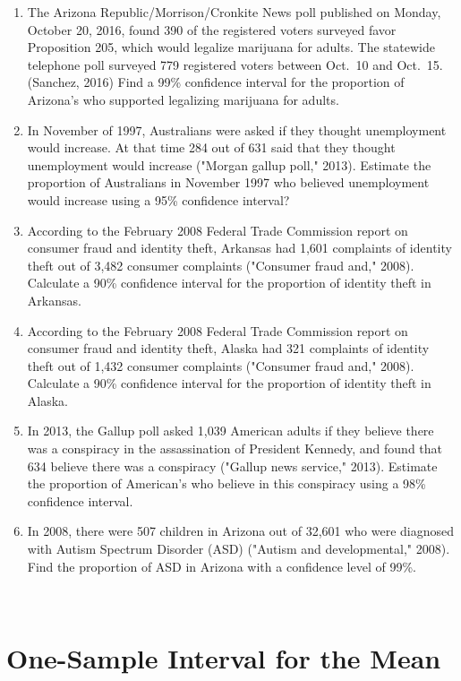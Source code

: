 \documentclass[]{book}
\begin{document}
\begin{enumerate}
\def\labelenumi{\arabic{enumi}.}
\item
  The Arizona Republic/Morrison/Cronkite News poll published on Monday, October 20, 2016, found 390 of the registered voters surveyed favor Proposition 205, which would legalize marijuana for adults. The statewide telephone poll surveyed 779 registered voters between Oct.~10 and Oct.~15. (Sanchez, 2016) Find a 99\% confidence interval for the proportion of Arizona's who supported legalizing marijuana for adults.
\item
  In November of 1997, Australians were asked if they thought unemployment would increase. At that time 284 out of 631 said that they thought unemployment would increase ("Morgan gallup poll," 2013). Estimate the proportion of Australians in November 1997 who believed unemployment would increase using a 95\% confidence interval?
\item
  According to the February 2008 Federal Trade Commission report on consumer fraud and identity theft, Arkansas had 1,601 complaints of identity theft out of 3,482 consumer complaints ("Consumer fraud and," 2008). Calculate a 90\% confidence interval for the proportion of identity theft in Arkansas.
\item
  According to the February 2008 Federal Trade Commission report on consumer fraud and identity theft, Alaska had 321 complaints of identity theft out of 1,432 consumer complaints ("Consumer fraud and," 2008). Calculate a 90\% confidence interval for the proportion of identity theft in Alaska.
\item
  In 2013, the Gallup poll asked 1,039 American adults if they believe there was a conspiracy in the assassination of President Kennedy, and found that 634 believe there was a conspiracy ("Gallup news service," 2013). Estimate the proportion of American's who believe in this conspiracy using a 98\% confidence interval.
\item
  In 2008, there were 507 children in Arizona out of 32,601 who were diagnosed with Autism Spectrum Disorder (ASD) ("Autism and developmental," 2008). Find the proportion of ASD in Arizona with a confidence level of 99\%.
\end{enumerate}

\textbf{\\
}

\hypertarget{one-sample-interval-for-the-mean}{%
\section{One-Sample Interval for the Mean}\label{one-sample-interval-for-the-mean}}
\end{document}
